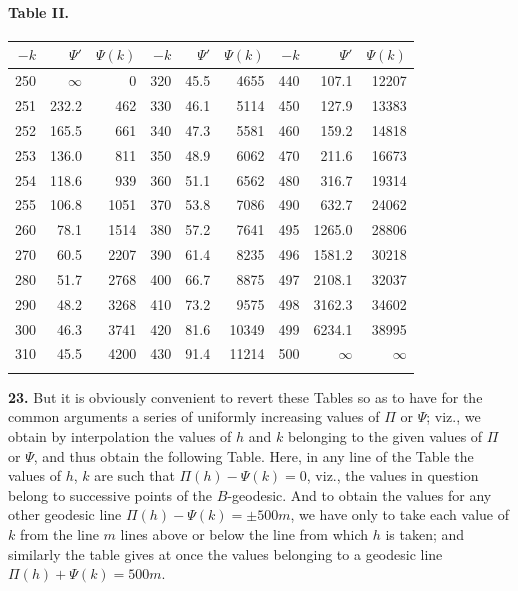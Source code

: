 \documentclass[11pt,a4paper]{article}
\begin{document}
\paragraph*{Table II.}

\begin{center}
\begin{tabular}{|r|r|r||r|r|r||r|r|r|}
\hline
$-k$ & $\Psi'$ & $\Psi(k)$ & $-k$ & $\Psi'$ & $\Psi(k)$ & $-k$ & $\Psi'$ & $\Psi(k)$ \\\hline
250 & $\infty$ & 0 & 320 & 45.5 & 4655 & 440 & 107.1 & 12207 \\
251 & 232.2 & 462 & 330 & 46.1 & 5114 & 450 & 127.9 & 13383 \\
252 & 165.5 & 661 & 340 & 47.3 & 5581 & 460 & 159.2 & 14818 \\
253 & 136.0 & 811 & 350 & 48.9 & 6062 & 470 & 211.6 & 16673 \\
254 & 118.6 & 939 & 360 & 51.1 & 6562 & 480 & 316.7 & 19314 \\
255 & 106.8 & 1051 & 370 & 53.8 & 7086 & 490 & 632.7 & 24062 \\
260 & 78.1 & 1514 & 380 & 57.2 & 7641 & 495 & 1265.0 & 28806 \\
270 & 60.5 & 2207 & 390 & 61.4 & 8235 & 496 & 1581.2 & 30218 \\
280 & 51.7 & 2768 & 400 & 66.7 & 8875 & 497 & 2108.1 & 32037 \\
290 & 48.2 & 3268 & 410 & 73.2 & 9575 & 498 & 3162.3 & 34602 \\
300 & 46.3 & 3741 & 420 & 81.6 & 10349 & 499 & 6234.1 & 38995 \\
310 & 45.5 & 4200 & 430 & 91.4 & 11214 & 500 & $\infty$ & $\infty$ \\
& & & & & & & & \\
\hline
\end{tabular}
\end{center}

\noindent\textbf{23.} But it is obviously convenient to revert these Tables so as to have for the common arguments a series of uniformly increasing values of $\Pi$ or $\Psi$; viz., we obtain by interpolation the values of $h$ and $k$ belonging to the given values of $\Pi$ or $\Psi$, and thus obtain the following Table. Here, in any line of the Table the values of $h$, $k$ are such that $\Pi(h) - \Psi(k) = 0$, viz., the values in question belong to successive points of the $B$-geodesic. And to obtain the values for any other geodesic line $\Pi(h) - \Psi(k) = \pm 500m$, we have only to take each value of $k$ from the line $m$ lines above or below the line from which $h$ is taken; and similarly the table gives at once the values belonging to a geodesic line $\Pi(h) + \Psi(k) = 500m$.
\end{document}
